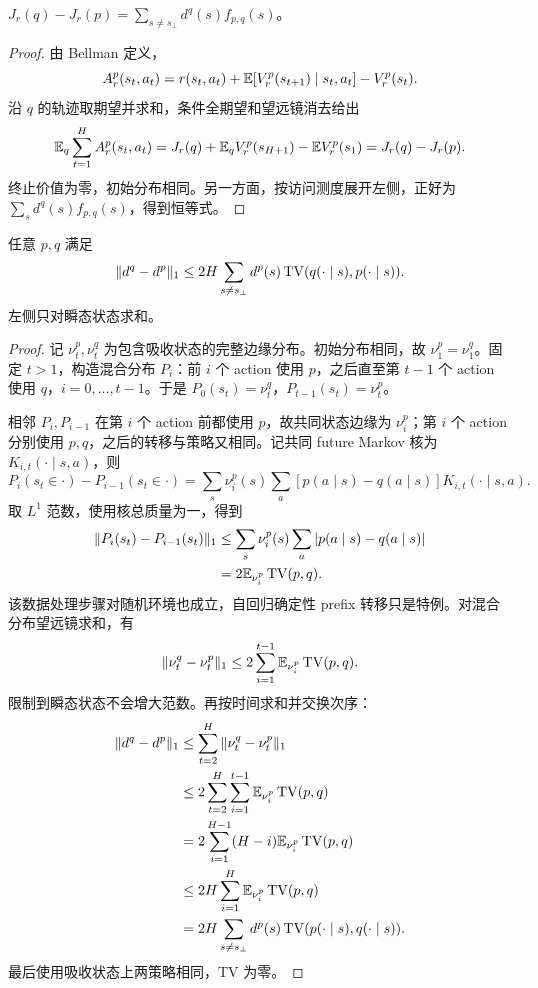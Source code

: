\begin{lemma}[有限时域性能差异恒等式]
\label{lem:topd-performance-difference}
$J_r(q)-J_r(p)=\sum_{s\ne s_\bot}d^q(s)f_{p,q}(s)$。
\end{lemma}
\begin{proof}
由 Bellman 定义，
\[
 A_r^p(s_t,a_t)=r(s_t,a_t)+\mathbb{E}[V_r^p(s_{t+1})\mid s_t,a_t]-V_r^p(s_t).
\]
沿 $q$ 的轨迹取期望并求和，条件全期望和望远镜消去给出
\[
 \mathbb{E}_q\sum_{t=1}^HA_r^p(s_t,a_t)
 =J_r(q)+\mathbb{E}_qV_r^p(s_{H+1})-\mathbb{E} V_r^p(s_1)=J_r(q)-J_r(p).
\]
终止价值为零，初始分布相同。另一方面，按访问测度展开左侧，正好为 $\sum_sd^q(s)f_{p,q}(s)$，得到恒等式。
\end{proof}

\begin{lemma}[访问测度漂移]
\label{lem:topd-occupancy-shift}
任意 $p,q$ 满足
\begin{equation}
 \|d^q-d^p\|_1\leq2H\sum_{s\ne s_\bot}d^p(s)\operatorname{TV}(q(\cdot\mid s),p(\cdot\mid s)).
 \label{eq:topd-occupancy-shift}
\end{equation}
左侧只对瞬态状态求和。
\end{lemma}
\begin{proof}
记 $\nu_t^p,\nu_t^q$ 为包含吸收状态的完整边缘分布。初始分布相同，故 $\nu_1^p=\nu_1^q$。固定 $t>1$，构造混合分布 $P_i$：前 $i$ 个 action 使用 $p$，之后直至第 $t-1$ 个 action 使用 $q$，$i=0,\ldots,t-1$。于是 $P_0(s_t)=\nu_t^q$，$P_{t-1}(s_t)=\nu_t^p$。

相邻 $P_i,P_{i-1}$ 在第 $i$ 个 action 前都使用 $p$，故共同状态边缘为 $\nu_i^p$；第 $i$ 个 action 分别使用 $p,q$，之后的转移与策略又相同。记共同 future Markov 核为 $K_{i,t}(\cdot\mid s,a)$，则
\[
 P_i(s_t\in\cdot)-P_{i-1}(s_t\in\cdot)
 =\sum_s\nu_i^p(s)\sum_a[p(a\mid s)-q(a\mid s)]K_{i,t}(\cdot\mid s,a).
\]
取 $L^1$ 范数，使用核总质量为一，得到
\begin{align*}
 \|P_i(s_t)-P_{i-1}(s_t)\|_1
 &\leq\sum_s\nu_i^p(s)\sum_a|p(a\mid s)-q(a\mid s)|\\
 &=2\mathbb{E}_{\nu_i^p}\operatorname{TV}(p,q).
\end{align*}
该数据处理步骤对随机环境也成立，自回归确定性 prefix 转移只是特例。对混合分布望远镜求和，有
\[
 \|\nu_t^q-\nu_t^p\|_1\leq2\sum_{i=1}^{t-1}\mathbb{E}_{\nu_i^p}\operatorname{TV}(p,q).
\]
限制到瞬态状态不会增大范数。再按时间求和并交换次序：
\begin{align*}
 \|d^q-d^p\|_1&\leq\sum_{t=2}^H\|\nu_t^q-\nu_t^p\|_1\\
 &\leq2\sum_{t=2}^H\sum_{i=1}^{t-1}\mathbb{E}_{\nu_i^p}\operatorname{TV}(p,q)\\
 &=2\sum_{i=1}^{H-1}(H-i)\mathbb{E}_{\nu_i^p}\operatorname{TV}(p,q)\\
 &\leq2H\sum_{i=1}^H\mathbb{E}_{\nu_i^p}\operatorname{TV}(p,q)\\
 &=2H\sum_{s\ne s_\bot}d^p(s)\operatorname{TV}(p(\cdot\mid s),q(\cdot\mid s)).
\end{align*}
最后使用吸收状态上两策略相同，TV 为零。
\end{proof}

